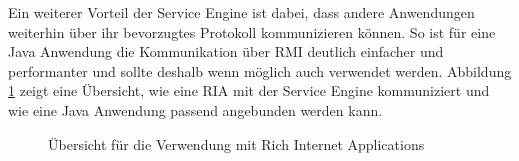 Ein weiterer Vorteil der Service Engine ist dabei, dass andere Anwendungen
weiterhin über ihr bevorzugtes Protokoll kommunizieren können. So ist für eine
Java Anwendung die Kommunikation über \ac{RMI} deutlich einfacher und
performanter und sollte deshalb wenn möglich auch verwendet werden. Abbildung
\ref{ill:rias} zeigt eine Übersicht, wie eine \ac{RIA} mit der Service Engine
kommuniziert und wie eine Java Anwendung passend angebunden werden kann.

\begin{figure}
	\caption{Übersicht für die Verwendung mit Rich Internet Applications}
	\label{ill:rias}
\end{figure}

\pagebreak
